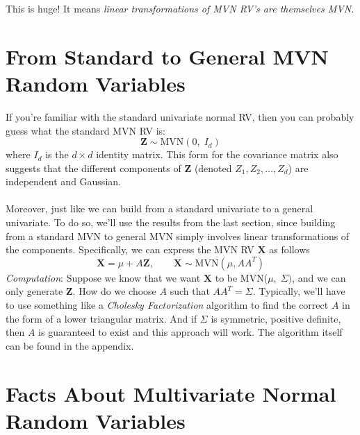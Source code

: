 \documentclass[a4paper,12pt]{scrartcl}
\begin{document}
This is huge! It means \emph{linear transformations of MVN
RV's are themselves MVN.}


\newpage
\section{From Standard to General MVN Random Variables}

If you're familiar with the standard univariate normal RV,
then you can probably guess what the standard MVN RV is:
\begin{equation}
    \mathbf{Z} \sim \text{MVN}(0, \; I_d) 
\end{equation}
where $I_d$ is the $d\times d$ identity matrix.  This form for
the covariance matrix also suggests that the different components
of $\mathbf{Z}$ (denoted $Z_1, Z_2, \ldots, Z_d$) are independent and
Gaussian.
\\
\\
Moreover, just like we can build from a standard univariate to
a general univariate.  To do so, we'll use the results from the 
last section, since building from a standard MVN
to general MVN simply involves linear transformations of the components.
Specifically, we can express the MVN RV $\mathbf{X}$ as follows
\begin{equation}
    \mathbf{X} = \mu + A\mathbf{Z}, \qquad \mathbf{X}\sim 
	\text{MVN}(\mu, AA^T)
\end{equation}
{\sl Computation}: Suppose we know that we want $\mathbf{X}$ to
be MVN($\mu, \; \Sigma)$, and we can only generate $\mathbf{Z}$.
How do we choose $A$ such that $AA^T = \Sigma$.  Typically, we'll
have to use something like a \emph{Cholesky Factorization}
algorithm to find the correct $A$ in the form of a lower triangular
matrix. And if $\Sigma$ is symmetric, positive definite, then 
$A$ is guaranteed to exist and this approach will work. 
The algorithm itself can be found in the appendix.


\section{Facts About Multivariate Normal Random Variables}
\end{document}

